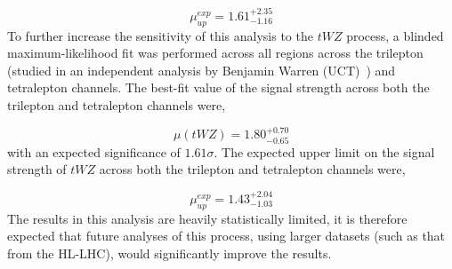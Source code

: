 \begin{equation}
  \mu_{up}^{exp} =   1.61^{+2.35}_{-1.16}
\end{equation}
To further increase the sensitivity of this analysis to the $tWZ$ process, a blinded maximum-likelihood fit was performed across all regions across the trilepton (studied in an independent analysis by Benjamin Warren (UCT)~\cite{ben-thesis}) and tetralepton channels. The best-fit value of the signal strength across both the trilepton and tetralepton channels were,

\begin{equation}
  \mu (tWZ) =   1.80^{+0.70}_{-0.65}
\end{equation}
with an expected significance of $1.61\sigma$. The expected upper limit on the signal strength of $tWZ$ across both the trilepton and tetralepton channels were,

\begin{equation}
  \mu_{up}^{exp} =   1.43^{+2.04}_{-1.03}
\end{equation}
The results in this analysis are heavily statistically limited, it is therefore expected that future analyses of this process, using larger datasets (such as that from the HL-LHC), would significantly improve the results.










